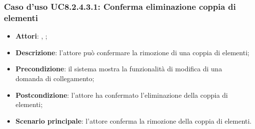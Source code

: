 		\subsubsection{Caso d'uso UC8.2.4.3.1: Conferma eliminazione coppia di elementi}
		\label{UC8.2.4.3.1}
		\begin{itemize}
			\item \textbf{Attori}: \uau, \uaupro;
			\item \textbf{Descrizione}: l'attore può confermare la rimozione di una coppia di elementi;
			\item \textbf{Precondizione}: il sistema mostra la funzionalità di modifica di una domanda di collegamento; 
			\item \textbf{Postcondizione}: l'attore ha confermato l'eliminazione della coppia di elementi;
			\item \textbf{Scenario principale}: l'attore conferma la rimozione della coppia di elementi.
		\end{itemize}

